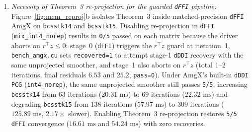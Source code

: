 \documentclass[10pt]{article}
\begin{document}
\begin{enumerate}
zero recoveries, on the separate untimed \texttt{warm} (\texttt{step=0}) $128^3$ (5/5) and $192^3$ (3/3) systems \emph{all three} \texttt{dFFI} smoothers (\texttt{mix\_jacobi}, \texttt{mix\_fp16\_rep}, \texttt{mix\_int4\_rep}) triggered the outer \texttt{PCG} $r^\top z$ curvature guard and fell back cleanly to \texttt{dDDI} (24 warm rows in \texttt{amgx\_8cases.csv}, e.g., $\approx 540\text{ ms}$ recovered \texttt{dFFI} vs.\ $\approx 157\text{ ms}$ plain \texttt{dDDI} on $128^3$ \texttt{step=0}), underscoring that mixed-precision \texttt{dFFI} inner V-cycles are inherently sensitive to \texttt{FP32} hierarchy asymmetry and require the outer $r^\top z$ guard and \texttt{dDDI} fallback regardless of smoother.
  \item \emph{Necessity of Theorem~3 re-projection for the guarded \texttt{dFFI} pipeline:} Figure~\ref{fig:mem_reproj}b isolates Theorem~3 inside matched-precision \texttt{dFFI} AmgX on \texttt{bcsstk14} and \texttt{bcsstk15}. Disabling re-projection in \texttt{dFFI} (\texttt{mix\_int4\_norep}) results in \texttt{0/5} passed on each matrix because the driver aborts on $r^\top z \le 0$: stage~0 (\texttt{dFFI}) triggers the $r^\top z$ guard at iteration~1, \texttt{bench\_amgx.cu} sets \texttt{recovered=1} to attempt stage-1 \texttt{dDDI} recovery with the same unprojected smoother, and stage~1 also aborts on $r^\top z$ (total 1--2 iterations, final residuals $6.53$ and $25.2$, \texttt{pass=0}). Under AmgX's built-in \texttt{dDDI} \texttt{PCG} (\texttt{int4\_norep}), the same unprojected smoother still passes \texttt{5/5}, increasing \texttt{bcsstk14} from $63$ iterations ($20.31\text{ ms}$) to $69$ iterations ($22.32\text{ ms}$) and degrading \texttt{bcsstk15} from $138$ iterations ($57.97\text{ ms}$) to $309$ iterations ($125.89\text{ ms}$, $2.17\times$ slower). Enabling Theorem~3 re-projection restores \texttt{5/5} \texttt{dFFI} convergence ($16.61\text{ ms}$ and $54.24\text{ ms}$) with zero recoveries.

\end{enumerate}
\end{document}
